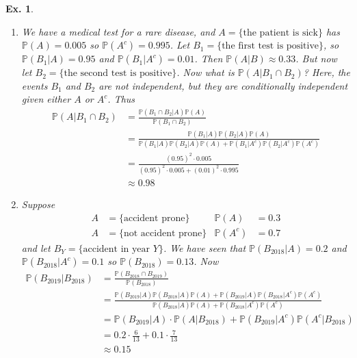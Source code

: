 \documentclass[12pt, a4paper]{book}
\renewcommand{\Pr}{\mathbb{P}}
\newtheorem{example}[theorem]{Ex.}
\theoremstyle{nonumberplain}
\begin{document}
\begin{example}
    \begin{enumerate}
        \item We have a medical test for a rare disease, and $A=\{\text{the patient is sick}\}$ has $\Pr(A)=0.005$ so $\Pr(A^c)=0.995$.
            Let $B_1=\{\text{the first test is positive}\}$, so $\Pr(B_1|A)=0.95$ and $\Pr(B_1|A^c)=0.01$.
            Then $\Pr(A|B)\approx 0.33$.
            But now let $B_2=\{\text{the second test is positive}\}$.
            Now what is $\Pr(A|B_1\cap B_2)$?
            Here, the events $B_1$ and $B_2$ are not independent, but they are conditionally independent given either $A$ or $A^c$.
            Thus
            \begin{align*}
                \Pr(A|B_1\cap B_2)&=\frac{\Pr(B_1\cap B_2|A)\Pr(A)}{\Pr(B_1\cap B_2)}\\
                                  &= \frac{\Pr(B_1|A)\Pr(B_2|A)\Pr(A)}{\Pr(B_1|A)\Pr(B_2|A)\Pr(A)+\Pr(B_1|A^c)\Pr(B_2|A^c)\Pr(A^c)}\\
                                  &= \frac{(0.95)^2\cdot 0.005}{(0.95)^2\cdot 0.005+(0.01)^2\cdot 0.995}\\
                                  &\approx 0.98
            \end{align*}
        \item Suppose
            \begin{align*}
                A &= \{\text{accident prone}\} & \Pr(A) &= 0.3\\
                A &= \{\text{not accident prone}\} & \Pr(A^c) &= 0.7
            \end{align*}
            and let $B_{Y}=\{\text{accident in year $Y$}\}$.
            We have seen that $\Pr(B_{2018}|A)=0.2$ and $\Pr(B_{2018}|A^c)=0.1$ so $\Pr(B_{2018})=0.13$.
            Now
            \begin{align*}
                \Pr(B_{2019}|B_{2018}) &= \frac{\Pr(B_{2018}\cap B_{2019})}{\Pr(B_{2018})}\\
                                       &= \frac{\Pr(B_{2019}|A)\Pr(B_{2018}|A)\Pr(A)+\Pr(B_{2019}|A)\Pr(B_{2018}|A^c)\Pr(A^c)}{\Pr(B_{2018}|A)\Pr(A)+\Pr(B_{2018}|A^c)\Pr(A^c)}\\
                                       &= \Pr(B_{2019}|A)\cdot\Pr(A|B_{2018})+\Pr(B_{2019}|A^c)\Pr(A^c|B_{2018})\\
                                       &= 0.2\cdot\frac{6}{13}+0.1\cdot\frac{7}{13}\\
                                       &\approx 0.15
            \end{align*}
    \end{enumerate}
\end{example}
\end{document}
